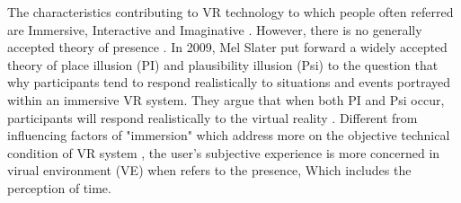 \documentclass[sigconf]{acmart}
\begin{document}

The characteristics contributing to VR technology to which people often referred are Immersive, Interactive and Imaginative \cite{Burdea:1994:VRT:177812}. However, there is no generally accepted theory of presence \cite{ijsselsteijn2000presence,birkenbusch2013concepts,skarbez2016plausibility,darken1999quantitative}. In 2009, Mel Slater put forward a widely accepted theory of place illusion (PI) and plausibility illusion (Psi) to the question that why participants tend to respond realistically to situations and events portrayed within an immersive VR system. They argue that when both PI and Psi occur, participants will respond realistically to the virtual reality \cite{slater2009place}. Different from influencing factors of "immersion" which address more on the objective technical condition of VR system \cite{bowman2007virtual,slater1999measuring,riva2011intention,slater1997framework}, the user's subjective experience is more concerned in virual environment (VE) when refers to the presence, Which includes the perception of time.


\end{document}
